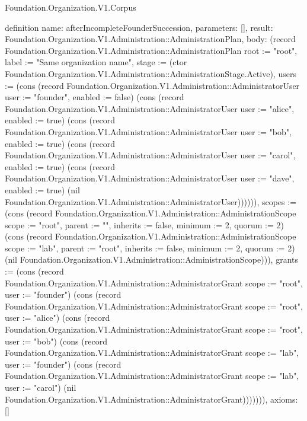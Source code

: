 \begin{lexlean}{Foundation.Organization.V1.Corpus}
\begin{semanticmodule}
definition{
  name: afterIncompleteFounderSuccession,
  parameters: [],
  result: Foundation.Organization.V1.Administration::AdministrationPlan,
  body: (record Foundation.Organization.V1.Administration::AdministrationPlan {root := "root", label := "Same organization name", stage := (ctor Foundation.Organization.V1.Administration::AdministrationStage.Active), users := (cons (record Foundation.Organization.V1.Administration::AdministratorUser {user := "founder", enabled := false}) (cons (record Foundation.Organization.V1.Administration::AdministratorUser {user := "alice", enabled := true}) (cons (record Foundation.Organization.V1.Administration::AdministratorUser {user := "bob", enabled := true}) (cons (record Foundation.Organization.V1.Administration::AdministratorUser {user := "carol", enabled := true}) (cons (record Foundation.Organization.V1.Administration::AdministratorUser {user := "dave", enabled := true}) (nil Foundation.Organization.V1.Administration::AdministratorUser)))))), scopes := (cons (record Foundation.Organization.V1.Administration::AdministrationScope {scope := "root", parent := "", inherits := false, minimum := 2, quorum := 2}) (cons (record Foundation.Organization.V1.Administration::AdministrationScope {scope := "lab", parent := "root", inherits := false, minimum := 2, quorum := 2}) (nil Foundation.Organization.V1.Administration::AdministrationScope))), grants := (cons (record Foundation.Organization.V1.Administration::AdministratorGrant {scope := "root", user := "founder"}) (cons (record Foundation.Organization.V1.Administration::AdministratorGrant {scope := "root", user := "alice"}) (cons (record Foundation.Organization.V1.Administration::AdministratorGrant {scope := "root", user := "bob"}) (cons (record Foundation.Organization.V1.Administration::AdministratorGrant {scope := "lab", user := "founder"}) (cons (record Foundation.Organization.V1.Administration::AdministratorGrant {scope := "lab", user := "carol"}) (nil Foundation.Organization.V1.Administration::AdministratorGrant))))))}),
  axioms: []
}


\end{semanticmodule}
\end{lexlean}
